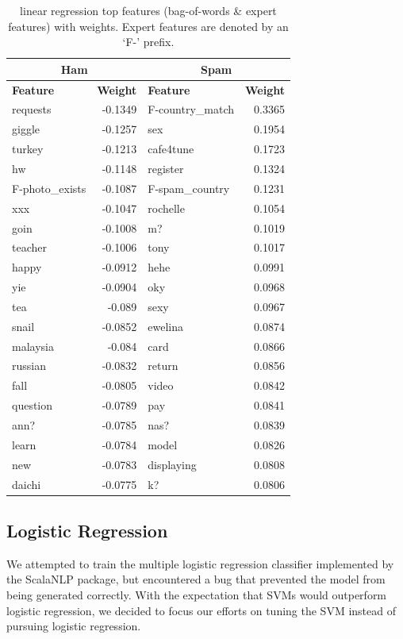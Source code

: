\documentclass[preprint]{acm_proc_article-sp}
\begin{document}
\begin{table}
\begin{tabular}{l|r||l|r}
\multicolumn{2}{c}{\textbf{Ham}} & 
\multicolumn{2}{c}{\textbf{Spam}} \\
\hline
\textbf{Feature} & \textbf{Weight} & \textbf{Feature} & \textbf{Weight} \\
\hline
requests & -0.1349 & F-country\_match & 0.3365\\
giggle & -0.1257 & sex & 0.1954\\
turkey & -0.1213 & cafe4tune & 0.1723\\
hw & -0.1148 & register & 0.1324\\
F-photo\_exists & -0.1087 & F-spam\_country & 0.1231\\
xxx & -0.1047 & rochelle & 0.1054\\
goin & -0.1008 & m? & 0.1019\\
teacher & -0.1006 & tony & 0.1017\\
happy & -0.0912 & hehe & 0.0991\\
yie & -0.0904 & oky & 0.0968\\
tea & -0.089 & sexy & 0.0967\\
snail & -0.0852 & ewelina & 0.0874\\
malaysia & -0.084 & card & 0.0866\\
russian & -0.0832 & return & 0.0856\\
fall & -0.0805 & video & 0.0842\\
question & -0.0789 & pay & 0.0841\\
ann? & -0.0785 & nas? & 0.0839\\
learn & -0.0784 & model & 0.0826\\
new & -0.0783 & displaying & 0.0808\\
daichi & -0.0775 & k?  & 0.0806\\
\end{tabular}
\caption{linear regression top features (bag-of-words \& expert features) with weights. Expert features
are denoted by an `F-' prefix.}
\label{tab:lrfeatse}
\end{table}

\subsection{Logistic Regression}

We attempted to train the multiple logistic regression classifier implemented by the ScalaNLP package, 
but encountered a bug that prevented the model from being generated correctly. With the expectation 
that SVMs would outperform logistic regression, we decided to focus our efforts on tuning the SVM 
instead of pursuing logistic regression. 
\end{document}
